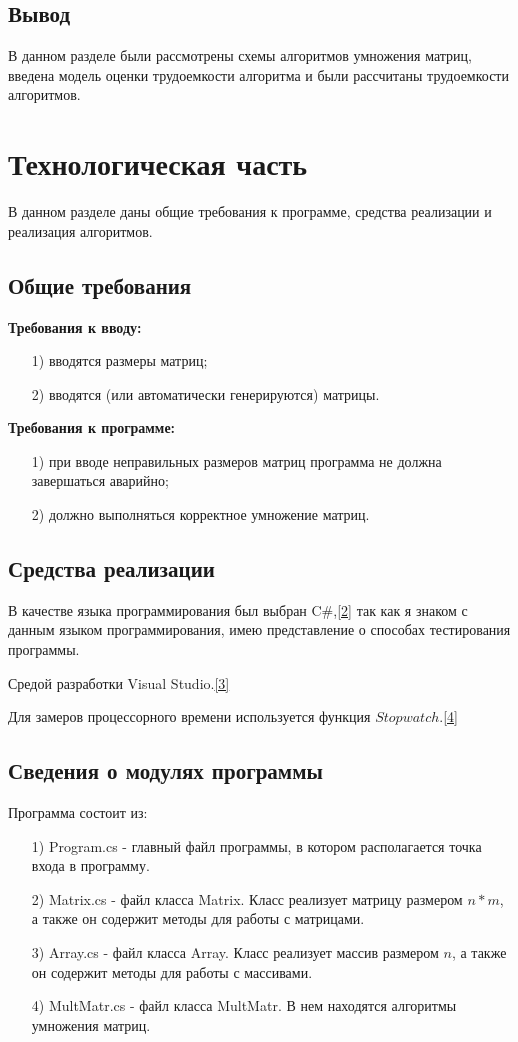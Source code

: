 \documentclass[12pt]{report}
\begin{document}
	\section{Вывод}
	В данном разделе были рассмотрены схемы алгоритмов умножения матриц, введена модель оценки трудоемкости алгоритма и были рассчитаны трудоемкости алгоритмов.
	
	\chapter{Технологическая часть}
	В данном разделе даны общие требования к программе, средства реализации и реализация алгоритмов.
	\section{Общие требования}
	\textbf{Требования к вводу:}
	\begin{enumerate}
		\item[1)] вводятся размеры матриц;
		\item[2)] вводятся (или автоматически генерируются) матрицы.
	\end{enumerate}
	\noindent\textbf{Требования к программе:}
	\begin{enumerate}
		\item[1)] при вводе неправильных размеров матриц программа не должна завершаться аварийно;
		\item[2)] должно выполняться корректное умножение матриц.
	\end{enumerate}
	
	\section{Средства реализации}
	В качестве языка программирования был выбран C\#,\hyperref[literature]{[2]} так как я знаком с данным языком программирования, имею представление о способах тестирования программы.\par
	Средой разработки Visual Studio.\hyperref[literature]{[3]}\par 
	Для замеров процессорного времени используется функция $Stopwatch$.\hyperref[literature]{[4]}
	
	\section{Сведения о модулях программы}
	Программа состоит из:
	\begin{enumerate}
		\item[1)] Program.cs - главный файл программы, в котором располагается точка входа в программу.
		\item[2)] Matrix.cs - файл класса Matrix. Класс реализует матрицу размером $n*m$, а также он содержит методы для работы с матрицами.
		\item[3)] Array.cs - файл класса Array. Класс реализует массив размером $n$, а также он содержит методы для работы с массивами.
		\item[4)] MultMatr.cs - файл класса MultMatr. В нем находятся алгоритмы умножения матриц.
	\end{enumerate}
	
\end{document}

